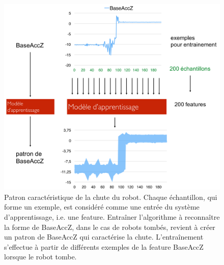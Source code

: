 \begin{figure}[H]
	\centering\includegraphics[width=12cm]{images/patron.png}
	\caption[Patron caractéristique de la chute du robot]{Patron caractéristique de la chute du robot. Chaque échantillon, qui forme un exemple, est considéré comme une entrée du système d'apprentissage, i.e. une feature. Entraîner l'algorithme à reconnaître la forme de BaseAccZ, dans le cas de robots tombés, revient à créer un patron de BaseAccZ qui caractérise la chute. L'entraînement s'effectue à partir de différents exemples de la feature BaseAccZ lorsque le robot tombe.}
	\label{fig:Créer un patron caractéristique de la chute du robot}
\end{figure}

